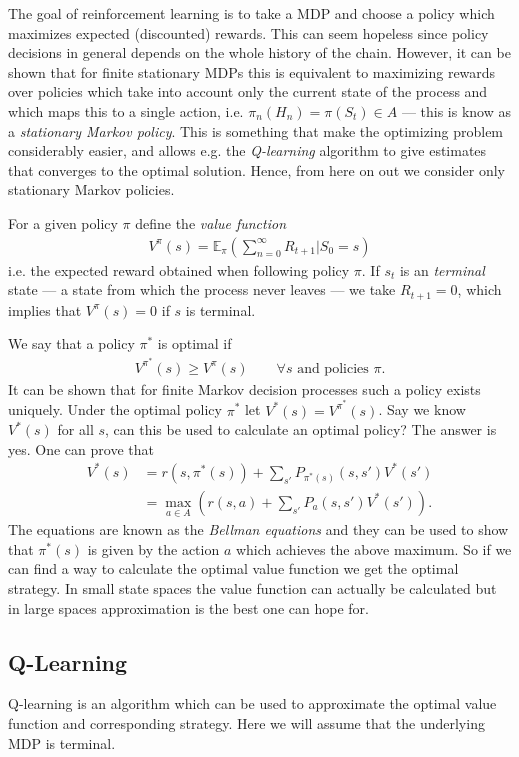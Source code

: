 The goal of reinforcement learning is to take a MDP and choose a policy which maximizes expected (discounted) rewards. This can seem hopeless since policy decisions in general depends on the whole history of the chain. However, it can be shown that for finite stationary MDPs this is equivalent to maximizing rewards over policies which take into account only the current state of the process and which maps this to a single action, i.e. $\pi_n(H_n) = \pi (S_t)\in A$ --- this is know as a \textit{stationary Markov policy}. This is something that make the optimizing problem considerably easier, and allows e.g. the \textit{Q-learning} algorithm to give estimates that converges to the optimal solution. Hence, from here on out we consider only stationary Markov policies.


For a given policy $\pi$ define the \textit{value function}
\begin{align} \label{eq:Vfun}
	V^{\pi}(s) = \mathbb{E}_{\pi}( \sum_{n=0}^{\infty} R_{t+1} | S_0 = s)
\end{align}
i.e. the expected reward obtained when following policy $\pi$. If $s_t$ is an \textit{terminal} state --- a state from which the process never leaves --- we take $R_{t+1} = 0$, which implies that $V^{\pi}(s) = 0$ if $s$ is terminal.

We say that a policy $\pi^*$ is optimal if 
\begin{align*}
	V^{\pi^*}(s) \geq V^{\pi}(s)\qquad \forall s \text{ and policies }\pi.
\end{align*}
It can be shown that for finite Markov decision processes such a policy exists uniquely. Under the optimal policy $\pi^*$ let $V^*(s) = V^{\pi^*}(s)$.
Say we know $V^*(s)$ for all $s$, can this be used to calculate an optimal policy? The answer is yes. One can prove that
\begin{align}
	V^*(s) 
	&=  r(s, \pi^*(s)) + \sum_{s'} P_{\pi^*(s)}(s,s')V^*(s') \\
	&= \max_{a \in A} ( r(s, a) + \sum_{s'} P_{a}(s,s')V^*(s') ).
\end{align}
The equations are known as the \textit{Bellman equations} and they can be used to show that $\pi^*(s)$ is given by the action $a$ which achieves the above maximum. So if we can find a way to calculate the optimal value function we get the optimal strategy. In small state spaces the value function can actually be calculated but in large spaces approximation is the best one can hope for.

\subsection*{Q-Learning}
Q-learning is an algorithm which can be used to approximate the optimal value function and corresponding strategy. Here we will assume that the underlying MDP is terminal.

